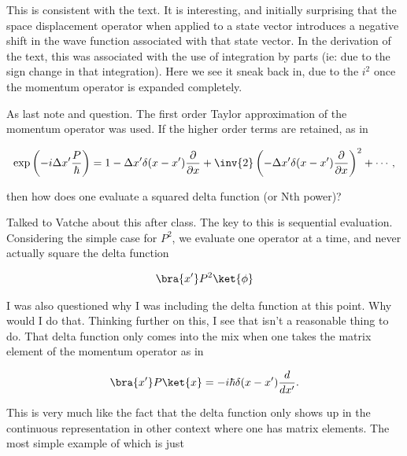 This is consistent with the text.  It is interesting, and initially surprising that the space displacement operator when applied to a state vector introduces a negative shift in the wave function associated with that state vector.  In the derivation of the text, this was associated with the use of integration by parts (ie: due to the sign change in that integration).  Here we see it sneak back in, due to the $i^2$ once the momentum operator is expanded completely.

As last note and question.  The first order Taylor approximation of the momentum operator was used.  If the higher order terms are retained, as in

\begin{align*}
\exp\left( -i \Delta x' \frac{P}{\hbar} \right) = 
1 - \Delta x' \delta(x -x') \frac{\partial}{\partial x} + 
\inv{2} \left( - \Delta x' \delta(x -x') \frac{\partial}{\partial x} \right)^2 + \cdots,
\end{align*}

then how does one evaluate a squared delta function (or Nth power)?

Talked to Vatche about this after class.  The key to this is sequential evaluation.  Considering the simple case for $P^2$, we evaluate one operator at a time, and never actually square the delta function

\begin{align*}
\bra{x'} P^2 \ket{\phi} 
\end{align*}

I was also questioned why I was including the delta function at this point.  Why would I do that.  Thinking further on this, I see that isn't a reasonable thing to do.  That delta function only comes into the mix when one takes the matrix element of the momentum operator as in

\begin{align*}
\bra{x'} P \ket{x} = -i \hbar \delta(x-x') \frac{d}{dx'}. 
\end{align*}

This is very much like the fact that the delta function only shows up in the continuous representation in other context where one has matrix elements.  The most simple example of which is just


